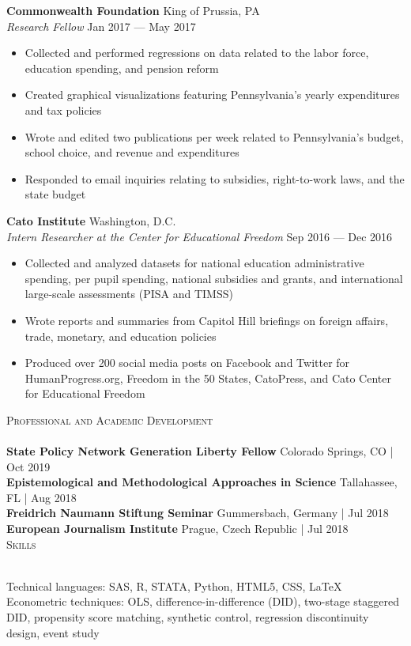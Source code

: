 \documentclass[a4paper]{article}
\newcommand{\lineunder} {
    \vspace*{-8pt} \\
    \hspace*{-18pt} \hrulefill \\
}
\newcommand{\header} [1] {
    {\hspace*{-18pt}\vspace*{6pt} \textsc{\large{#1}}}
    \vspace*{-6pt} \lineunder
}
\begin{document}
\textbf{Commonwealth Foundation} \hfill King of Prussia, PA\\
\textit{Research Fellow} \hfill Jan 2017 --- May 2017\\
\begin{itemize}[noitemsep,nolistsep]
	\item Collected and performed regressions on data related to the labor force, education spending, and pension reform
	\item Created graphical visualizations featuring Pennsylvania’s yearly expenditures and tax policies
	\item Wrote and edited two publications per week related to Pennsylvania's budget, school choice, and revenue and expenditures
	\item Responded to email inquiries relating to subsidies, right-to-work laws, and the state budget
\end{itemize}
\vspace{1mm}
\textbf{Cato Institute} \hfill Washington, D.C.\\
\textit{Intern Researcher at the Center for Educational Freedom} \hfill Sep 2016 --- Dec 2016\\
\begin{itemize}[noitemsep,nolistsep]
	\item Collected and analyzed datasets for national education administrative spending, per pupil spending, national subsidies and grants, and international large-scale assessments (PISA and TIMSS)
	\item Wrote reports and summaries from Capitol Hill briefings on foreign affairs, trade, monetary, and education policies
	\item Produced over 200 social media posts on Facebook and Twitter for HumanProgress.org, Freedom in the 50 States, CatoPress, and Cato Center for Educational Freedom
\end{itemize}
\vspace{2mm}

\header{Professional and Academic Development} 
\textbf{State Policy Network Generation Liberty Fellow} \hfill Colorado Springs, CO | Oct 2019 \\
\vspace{1mm}
\textbf{Epistemological and Methodological Approaches in Science} \hfill Tallahassee, FL | Aug 2018\\
\vspace{1mm}
\textbf{Freidrich Naumann Stiftung Seminar} \hfill Gummersbach, Germany | Jul 2018\\
\vspace{1mm}
\textbf{European Journalism Institute} \hfill Prague, Czech Republic | Jul 2018\\

\header{Skills}
\vspace{1mm}

Technical languages: SAS, R, STATA, Python, HTML5, CSS, \LaTeX \\
\vspace{1mm}
Econometric techniques: OLS, difference-in-difference (DID), two-stage staggered DID, propensity score matching, synthetic control, regression discontinuity design, event study
\end{document}
